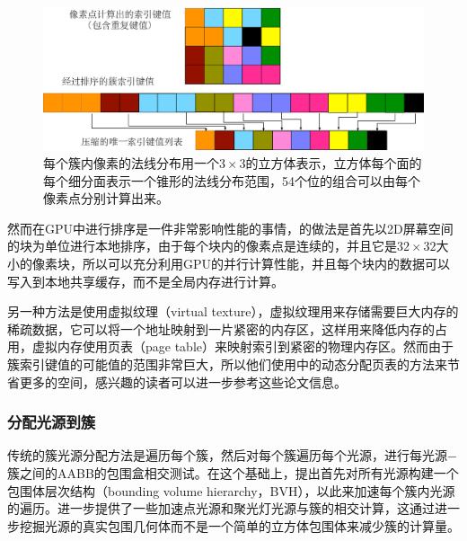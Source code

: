 \begin{figure}
\begin{center}
	\includegraphics[width=\textwidth]{figures/shade/sorted-key}
\end{center}
	\caption{每个簇内像素的法线分布用一个$3\times 3$的立方体表示，立方体每个面的每个细分面表示一个锥形的法线分布范围，54个位的组合可以由每个像素点分别计算出来。}
	\label{f:shade-sorted-key}
\end{figure}

然而在GPU中进行排序是一件非常影响性能的事情，\cite{a:ClusteredDeferredandForwardShading}的做法是首先以2D屏幕空间的块为单位进行本地排序，由于每个块内的像素点是连续的，并且它是$32\times 32$大小的像素块，所以可以充分利用GPU的并行计算性能，并且每个块内的数据可以写入到本地共享缓存，而不是全局内存进行计算。

另一种方法是使用虚拟纹理\cite{a:VirtualTexturing}（virtual texture），虚拟纹理用来存储需要巨大内存的稀疏数据，它可以将一个地址映射到一片紧密的内存区，这样用来降低内存的占用，虚拟内存使用页表（page table）来映射索引到紧密的物理内存区。然而由于簇索引键值的可能值的范围非常巨大，所以他们使用\cite{a:Glift:GenericEfficientRandom-AccessGPUDataStructures}中的动态分配页表的方法来节省更多的空间，感兴趣的读者可以进一步参考这些论文信息。






\subsubsection{分配光源到簇}
传统的簇光源分配方法是遍历每个簇，然后对每个簇遍历每个光源，进行每光源$-$簇之间的AABB的包围盒相交测试。在这个基础上，\cite{a:ClusteredDeferredandForwardShading}提出首先对所有光源构建一个包围体层次结构（bounding volume hierarchy，BVH），以此来加速每个簇内光源的遍历。\cite{a:PracticalClusteredShading}进一步提供了一些加速点光源和聚光灯光源与簇的相交计算，这通过进一步挖掘光源的真实包围几何体而不是一个简单的立方体包围体来减少簇的计算量。

